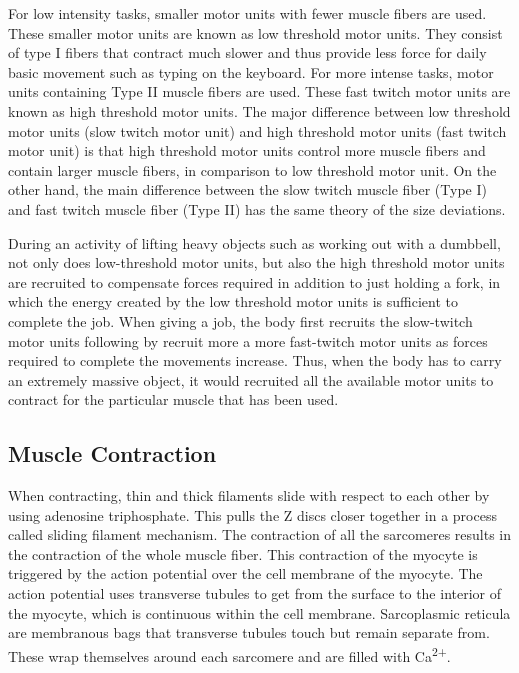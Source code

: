 \documentclass[]{book}
\begin{document}
For low intensity tasks, smaller motor units with fewer muscle fibers are used. These smaller motor units are known as low threshold motor units. They consist of type I fibers that contract much slower and thus provide less force for daily basic movement such as typing on the keyboard. For more intense tasks, motor units containing Type II muscle fibers are used. These fast twitch motor units are known as high threshold motor units. The major difference between low threshold motor units (slow twitch motor unit) and high threshold motor units (fast twitch motor unit) is that high threshold motor units control more muscle fibers and contain larger muscle fibers, in comparison to low threshold motor unit. On the other hand, the main difference between the slow twitch muscle fiber (Type I) and fast twitch muscle fiber (Type II) has the same theory of the size deviations.

During an activity of lifting heavy objects such as working out with a dumbbell, not only does low-threshold motor units, but also the high threshold motor units are recruited to compensate forces required in addition to just holding a fork, in which the energy created by the low threshold motor units is sufficient to complete the job. When giving a job, the body first recruits the slow-twitch motor units following by recruit more a more fast-twitch motor units as forces required to complete the movements increase. Thus, when the body has to carry an extremely massive object, it would recruited all the available motor units to contract for the particular muscle that has been used.

\hypertarget{muscle-contraction}{%
\subsection{Muscle Contraction}\label{muscle-contraction}}

When contracting, thin and thick filaments slide with respect to each other by using adenosine triphosphate. This pulls the Z discs closer together in a process called sliding filament mechanism. The contraction of all the sarcomeres results in the contraction of the whole muscle fiber. This contraction of the myocyte is triggered by the action potential over the cell membrane of the myocyte. The action potential uses transverse tubules to get from the surface to the interior of the myocyte, which is continuous within the cell membrane. Sarcoplasmic reticula are membranous bags that transverse tubules touch but remain separate from. These wrap themselves around each sarcomere and are filled with Ca\textsuperscript{2+}.
\end{document}
